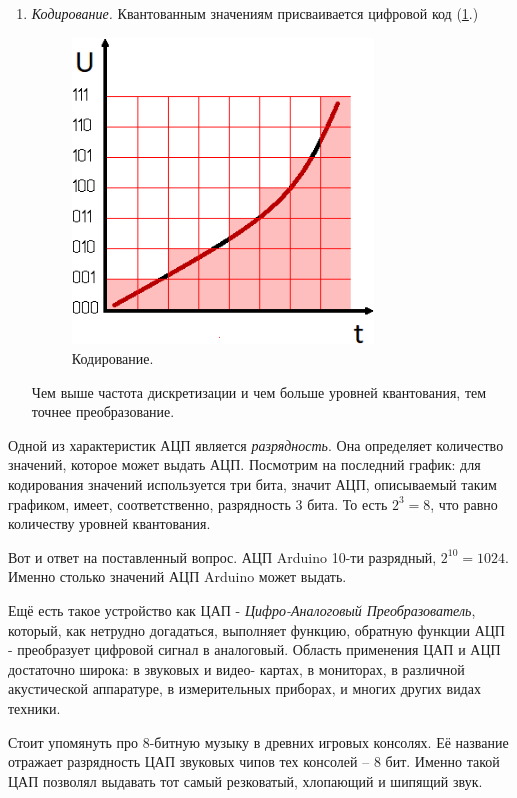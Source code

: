 \documentclass[a4paper,twoside]{book}
\begin{document}
\begin{enumerate}
\item \emph{Кодирование.} Квантованным значениям присваивается цифровой код
  (\ref{fig:coding}.)

  \begin{figure}[h]
    \caption{Кодирование.}
    \label{fig:coding}
    \includegraphics[width=8cm]{coding}
    \centering
  \end{figure}

  Чем выше частота дискретизации и чем больше уровней квантования, тем точнее
  преобразование.

\end{enumerate}

Одной из характеристик АЦП является \emph{разрядность}. Она определяет
количество значений, которое может выдать АЦП. Посмотрим на последний график:
для кодирования значений используется три бита, значит АЦП, описываемый таким
графиком, имеет, соответственно, разрядность 3 бита. То есть $ 2^3 = 8 $, что
равно количеству уровней квантования.

Вот и ответ на поставленный вопрос. АЦП Arduino 10-ти разрядный, $ 2^10 = 1024
$. Именно столько значений АЦП Arduino может выдать.

Ещё есть такое устройство как ЦАП - \emph{Цифро-Аналоговый Преобразователь},
который, как нетрудно догадаться, выполняет функцию, обратную функции АЦП -
преобразует цифровой сигнал в аналоговый. Область применения ЦАП и АЦП
достаточно широка: в звуковых и видео- картах, в мониторах, в различной
акустической аппаратуре, в измерительных приборах, и многих других видах
техники.

Стоит упомянуть про 8-битную музыку в древних игровых консолях. Её название
отражает разрядность ЦАП звуковых чипов тех консолей -- 8 бит. Именно такой ЦАП
позволял выдавать тот самый резковатый, хлопающий и шипящий звук.
\end{document}
